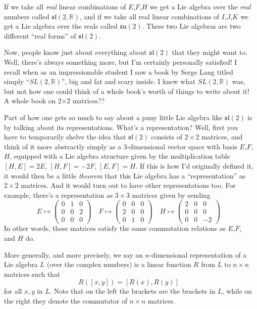 \documentclass{article}
\begin{document}
If we take all \emph{real} linear combinations of \(E\),\(F\),\(H\) we
get a Lie algebra over the \emph{real} numbers called
\(\mathfrak{sl}(2,\mathbb{R})\), and if we take all real linear
combinations of \(I\),\(J\),\(K\) we get a Lie algebra over the reals
called \(\mathfrak{su}(2)\). These two Lie algebras are two different
``real forms'' of \(\mathfrak{sl}(2)\).

Now, people know just about everything about \(\mathfrak{sl}(2)\) that
they might want to. Well, there's always something more, but I'm
certainly personally satisfied! I recall when as an impressionable
student I saw a book by Serge Lang titled simply
``\(SL(2,\mathbb{R})\)'', big and fat and scary inside. I knew what
\(SL(2,\mathbb{R})\) was, but not how one could think of a whole book's
worth of things to write about it! A whole book on 2×2 matrices??

Part of how one gets so much to say about a puny little Lie algebra like
\(\mathfrak{sl}(2)\) is by talking about its representations. What's a
representation? Well, first you have to temporarily shelve the idea that
\(\mathfrak{sl}(2)\) consists of \(2\times2\) matrices, and think of it
more abstractly simply as a 3-dimensional vector space with basis
\(E\),\(F\),\(H\), equipped with a Lie algebra structure given by the
multiplication table \([H,E] = 2E\), \([H,F] = -2F\), \([E,F] = H\). If
this is how I'd originally defined it, it would then be a little
\emph{theorem} that this Lie algebra has a ``representation'' as
\(2\times2\) matrices. And it would turn out to have other
representations too. For example, there's a representation as
\(3\times3\) matrices given by sending
\[E\mapsto\left(\begin{array}{ccc}0&1&0\\0&0&2\\0&0&0\end{array}\right) \quad F\mapsto\left(\begin{array}{ccc}0&0&0\\2&0&0\\0&1&0\end{array}\right) \quad H\mapsto\left(\begin{array}{ccc}2&0&0\\0&0&0\\0&0&-2\end{array}\right)\]
In other words, these matrices satisfy the same commutation relations as
\(E\),\(F\), and \(H\) do.

More generally, and more precisely, we say an \(n\)-dimensional
representation of a Lie algebra \(L\) (over the complex numbers) is a
linear function \(R\) from \(L\) to \(n\times n\) matrices such that
\[R([x,y]) = [R(x),R(y)]\] for all \(x,y\) in \(L\). Note that on the
left the brackets are the brackets in \(L\), while on the right they
denote the commutator of \(n\times n\) matrices.
\end{document}
